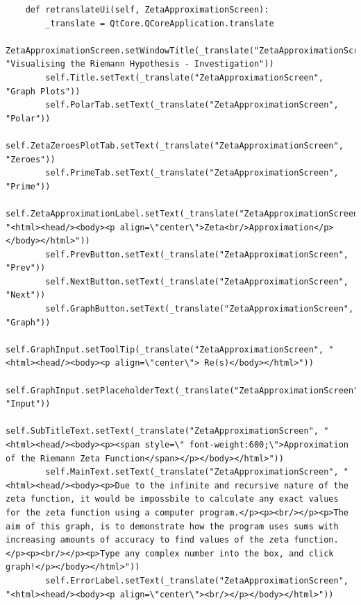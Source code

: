 \documentclass[12pt]{article}
\begin{document}
\begin{lstlisting}
    def retranslateUi(self, ZetaApproximationScreen):
        _translate = QtCore.QCoreApplication.translate
        ZetaApproximationScreen.setWindowTitle(_translate("ZetaApproximationScreen", "Visualising the Riemann Hypothesis - Investigation"))
        self.Title.setText(_translate("ZetaApproximationScreen", "Graph Plots"))
        self.PolarTab.setText(_translate("ZetaApproximationScreen", "Polar"))
        self.ZetaZeroesPlotTab.setText(_translate("ZetaApproximationScreen", "Zeroes"))
        self.PrimeTab.setText(_translate("ZetaApproximationScreen", "Prime"))
        self.ZetaApproximationLabel.setText(_translate("ZetaApproximationScreen", "<html><head/><body><p align=\"center\">Zeta<br/>Approximation</p></body></html>"))
        self.PrevButton.setText(_translate("ZetaApproximationScreen", "Prev"))
        self.NextButton.setText(_translate("ZetaApproximationScreen", "Next"))
        self.GraphButton.setText(_translate("ZetaApproximationScreen", "Graph"))
        self.GraphInput.setToolTip(_translate("ZetaApproximationScreen", "<html><head/><body><p align=\"center\"> Re(s)</body></html>"))
        self.GraphInput.setPlaceholderText(_translate("ZetaApproximationScreen", "Input"))
        self.SubTitleText.setText(_translate("ZetaApproximationScreen", "<html><head/><body><p><span style=\" font-weight:600;\">Approximation of the Riemann Zeta Function</span></p></body></html>"))
        self.MainText.setText(_translate("ZetaApproximationScreen", "<html><head/><body><p>Due to the infinite and recursive nature of the zeta function, it would be impossbile to calculate any exact values for the zeta function using a computer program.</p><p><br/></p><p>The aim of this graph, is to demonstrate how the program uses sums with increasing amounts of accuracy to find values of the zeta function.</p><p><br/></p><p>Type any complex number into the box, and click graph!</p></body></html>"))
        self.ErrorLabel.setText(_translate("ZetaApproximationScreen", "<html><head/><body><p align=\"center\"><br/></p></body></html>"))
\end{lstlisting}
\end{document}

